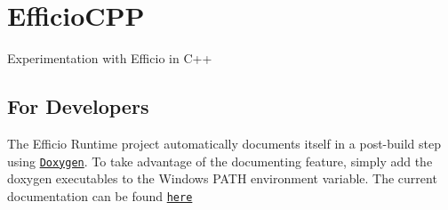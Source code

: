 \section*{Efficio\+C\+PP}

Experimentation with Efficio in C++

\subsection*{For Developers }

The Efficio Runtime project automatically documents itself in a post-\/build step using \href{http://doxygen.org/}{\tt Doxygen}. To take advantage of the documenting feature, simply add the doxygen executables to the Windows P\+A\+TH environment variable. The current documentation can be found \href{https://htmlpreview.github.io/?https://raw.githubusercontent.com/Abantech/EfficioCPP/master/EfficioRuntime/doc/html/index.html}{\tt here} 